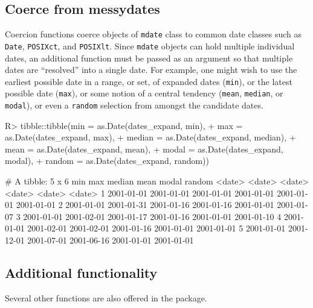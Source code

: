 \documentclass[
]{jss}
\begin{document}
\hypertarget{coerce-from-messydates}{%
\subsection{Coerce from messydates}\label{coerce-from-messydates}}

Coercion functions coerce objects of \texttt{mdate} class to common date
classes such as \texttt{Date}, \texttt{POSIXct}, and \texttt{POSIXlt}.
Since \texttt{mdate} objects can hold multiple individual dates, an
additional function must be passed as an argument so that multiple dates
are ``resolved'' into a single date. For example, one might wish to use
the earliest possible date in a range, or set, of expanded dates
(\texttt{min}), or the latest possible date (\texttt{max}), or some
notion of a central tendency (\texttt{mean}, \texttt{median}, or
\texttt{modal}), or even a \texttt{random} selection from amongst the
candidate dates.

\begin{CodeChunk}
\begin{CodeInput}
R> tibble::tibble(min = as.Date(dates_expand, min),
+                max = as.Date(dates_expand, max),
+                median = as.Date(dates_expand, median),
+                mean = as.Date(dates_expand, mean),
+                modal = as.Date(dates_expand, modal),
+                random = as.Date(dates_expand, random))
\end{CodeInput}
\begin{CodeOutput}
# A tibble: 5 x 6
  min        max        median     mean       modal      random    
  <date>     <date>     <date>     <date>     <date>     <date>    
1 2001-01-01 2001-01-01 2001-01-01 2001-01-01 2001-01-01 2001-01-01
2 2001-01-01 2001-01-31 2001-01-16 2001-01-16 2001-01-01 2001-01-07
3 2001-01-01 2001-02-01 2001-01-17 2001-01-16 2001-01-01 2001-01-10
4 2001-01-01 2001-02-01 2001-02-01 2001-01-16 2001-01-01 2001-01-01
5 2001-01-01 2001-12-01 2001-07-01 2001-06-16 2001-01-01 2001-01-01
\end{CodeOutput}
\end{CodeChunk}

\hypertarget{additional-functionality}{%
\subsection{Additional functionality}\label{additional-functionality}}

Several other functions are also offered in the 
package.
\end{document}
